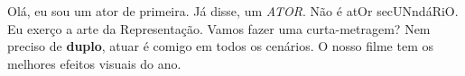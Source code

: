 

Olá, eu sou um ator de primeira. Já disse, um \emph{ATOR}. Não é atOr secUNndáRiO.
Eu exerço a arte da Representação.
Vamos fazer uma curta-metragem?
Nem preciso de \textbf{duplo}, atuar é comigo em todos os cenários.
O nosso filme tem os melhores efeitos visuais do ano.



